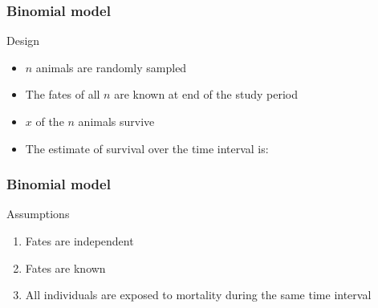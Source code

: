 \documentclass[color=usenames,dvipsnames]{beamer}\usepackage[]{graphicx}\usepackage[]{color}
\begin{document}
\begin{frame}
  \frametitle{Binomial model}
  \large
  {%
    Design}
  \begin{itemize}%
    \normalsize
    \item<1-> $n$ animals are randomly sampled %
    \item<2-> The fates of all $n$ are known at end of the study period
    \item<3-> $x$ of the $n$ animals survive
    \item<4-> The estimate of survival over the time interval is:
  \end{itemize}
  \pause
  \Large
  \vspace{0.5cm}
\end{frame}



\begin{frame}
  \frametitle{Binomial model}
  \large
  {%
    Assumptions}
  \begin{enumerate}[(1)]%
    \normalsize
    \item<1-> Fates are independent
    \item<1-> Fates are known
    \item<1-> All individuals are exposed to mortality during the same time interval
  \end{enumerate}
  \vspace{0.5cm}
  \vspace{0.5cm}
\end{frame}
\end{document}
